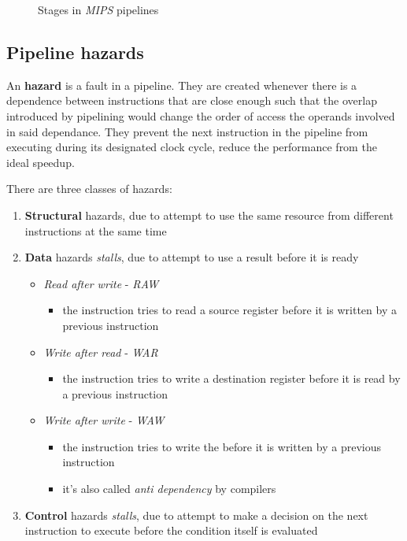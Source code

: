 \documentclass[english]{article}
\begin{document}
\begin{figure}[htbp]
  \bigskip
  \centering
  \caption{Stages in \textit{MIPS} pipelines}
  \label{fig:mips-pipeline-stages}
  \bigskip
\end{figure}

\subsection{Pipeline hazards}
\label{sec:pipeline-hazards}

An \textbf{hazard} is a fault in a pipeline.
They are created whenever there is a dependence between instructions that are close enough such that the overlap introduced by pipelining would change the order of access the operands involved in said dependance.
They prevent the next instruction in the pipeline from executing during its designated clock cycle, reduce the performance from the ideal speedup.

There are three classes of hazards:
\begin{enumerate}
  \item \textbf{Structural} hazards, due to attempt to use the same resource from different instructions at the same time
  \item \textbf{Data} hazards \textit{stalls}, due to attempt to use a result before it is ready
        \begin{itemize}
          \item \textit{Read after write} - \textit{RAW}
                \begin{itemize}[label=\(\rightarrow\)]
                  \item the instruction tries to read a source register before it is written by a previous instruction
                \end{itemize}
          \item \textit{Write after read} - \textit{WAR}
                \begin{itemize}[label=\(\rightarrow\)]
                  \item the instruction tries to write a destination register before it is read by a previous instruction
                \end{itemize}
          \item \textit{Write after write} - \textit{WAW}
                \begin{itemize}[label=\(\rightarrow\)]
                  \item the instruction tries to write the before it is written by a previous instruction
                  \item it's also called \textit{anti dependency} by compilers
                \end{itemize}
        \end{itemize}
  \item \textbf{Control} hazards \textit{stalls}, due to attempt to make a decision on the next instruction to execute before the condition itself is evaluated
\end{enumerate}
\end{document}
